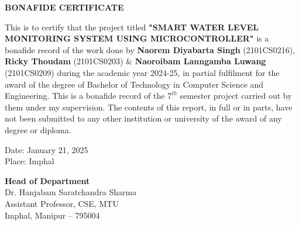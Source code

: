 \vspace*{0.6cm}
\begin{center}
    \fontsize{16}{19}\selectfont
    \textbf{BONAFIDE CERTIFICATE}\\[0.5cm]
\end{center}
\vspace{1cm}
{
\fontsize{12}{14}\selectfont
\noindent
This is to certify that the project titled \textbf{"SMART WATER LEVEL MONITORING SYSTEM USING MICROCONTROLLER"} is a bonafide record of the work done by \textbf{Naorem Diyabarta Singh} (2101CS0216), \textbf{Ricky Thoudam} (2101CS0203) \& \textbf{Naoroibam Lanngamba Luwang} (2101CS0209) during the academic year 2024-25, in partial fulfilment for the award of the degree of Bachelor of Technology in Computer Science and Engineering. This is a bonafide record of the $7^{th}$ semester project carried out by them under my supervision. The contents of this report, in full or in parts, have not been submitted to any other institution or university of the award of any degree or diploma.

\vspace{2cm}
\noindent
\begin{minipage}[t]{0.45\textwidth} %
    \begin{flushleft}
        Date: January 21, 2025\\
        Place: Imphal
    \end{flushleft}
\end{minipage}%
\hfill %
\begin{minipage}[t]{0.48\textwidth} %
    \begin{flushright}
            \textbf{Head of Department}\\
            Dr. Hanjabam Saratchandra Sharma\\
            Assistant Professor, CSE, MTU\\
            Imphal, Manipur -- 795004
    \end{flushright}
\end{minipage}
} 
